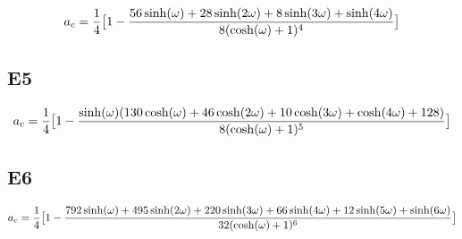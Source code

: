 \begin{equation}
a_c = {1 \over 4} \big[1 - {56 \sinh(\omega) + 28\sinh(2\omega) + 8
\sinh(3\omega) + \sinh(4\omega) \over
8 (\cosh(\omega) + 1)^4}\big]
\end{equation}

\subsection{E5}

\begin{equation}
a_c = {1 \over 4} \big[1 - {
\sinh(\omega)(130 \cosh(\omega) + 46 \cosh(2\omega) + 10
\cosh(3\omega) + \cosh(4\omega) + 128) 
\over
8 (\cosh(\omega) + 1)^5}\big]
\end{equation}

\subsection{E6}

\begin{equation}
a_c = {1 \over 4} \big[1 - {
792\sinh(\omega)+495\sinh(2\omega)+220\sinh(3\omega)+66\sinh(4\omega)+12\sinh(5\omega)+\sinh(6\omega)
\over
32 (\cosh(\omega) + 1)^6}\big]
\end{equation}

